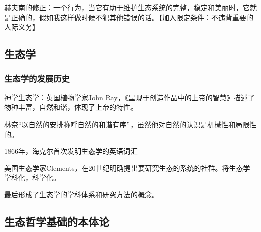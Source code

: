 \documentclass{ctexart}
\begin{document}
赫夫南的修正：一个行为，当它有助于维护生态系统的完整，稳定和美丽时，它就是正确的，假如我这样做时候不犯其他错误的话。【加入限定条件：不违背重要的人际义务】

\subsection{生态学}

\subsubsection{生态学的发展历史}

神学生态学：英国植物学家John Ray，《呈现于创造作品中的上帝的智慧》描述了物种丰富，自然和谐，体现了上帝的特性。

林奈“以自然的安排称呼自然的和谐有序”，虽然他对自然的认识是机械性和局限性的。

1866年，海克尔首次发明生态学的英语词汇

美国生态学家Clements，在20世纪明确提出要研究生态的系统的社群。将生态学学科化，科学化。

最后形成了生态学的学科体系和研究方法的概念。

\subsection{生态哲学基础的本体论}
\end{document}

